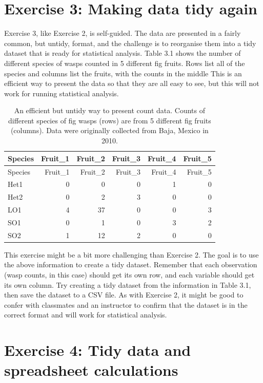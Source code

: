 \documentclass[
]{scrbook}
\begin{document}
\hypertarget{exercise-3-making-data-tidy-again}{%
\section{Exercise 3: Making data tidy again}\label{exercise-3-making-data-tidy-again}}

Exercise 3, like Exercise 2, is self-guided.
The data are presented in a fairly common, but untidy, format, and the challenge is to reorganise them into a tidy dataset that is ready for statistical analysis.
Table 3.1 shows the number of different species of wasps counted in 5 different fig fruits.
Rows list all of the species and columns list the fruits, with the counts in the middle
This is an efficient way to present the data so that they are all easy to see, but this will not work for running statistical analysis.

\begin{longtable}[]{@{}lrrrrr@{}}
\caption{\label{tab:unnamed-chunk-17}An efficient but untidy way to present count data. Counts of different species of fig wasps (rows) are from 5 different fig fruits (columns). Data were originally collected from Baja, Mexico in 2010.}\tabularnewline
\toprule
Species & Fruit\_1 & Fruit\_2 & Fruit\_3 & Fruit\_4 & Fruit\_5 \\
\midrule
\endfirsthead
\toprule
Species & Fruit\_1 & Fruit\_2 & Fruit\_3 & Fruit\_4 & Fruit\_5 \\
\midrule
\endhead
Het1 & 0 & 0 & 0 & 1 & 0 \\
Het2 & 0 & 2 & 3 & 0 & 0 \\
LO1 & 4 & 37 & 0 & 0 & 3 \\
SO1 & 0 & 1 & 0 & 3 & 2 \\
SO2 & 1 & 12 & 2 & 0 & 0 \\
\bottomrule
\end{longtable}

This exercise might be a bit more challenging than Exercise 2.
The goal is to use the above information to create a tidy dataset.
Remember that each observation (wasp counts, in this case) should get its own row, and each variable should get its own column.
Try creating a tidy dataset from the information in Table 3.1, then save the dataset to a CSV file.
As with Exercise 2, it might be good to confer with classmates and an instructor to confirm that the dataset is in the correct format and will work for statistical analysis.

\hypertarget{exercise-4-tidy-data-and-spreadsheet-calculations}{%
\section{Exercise 4: Tidy data and spreadsheet calculations}\label{exercise-4-tidy-data-and-spreadsheet-calculations}}
\end{document}
